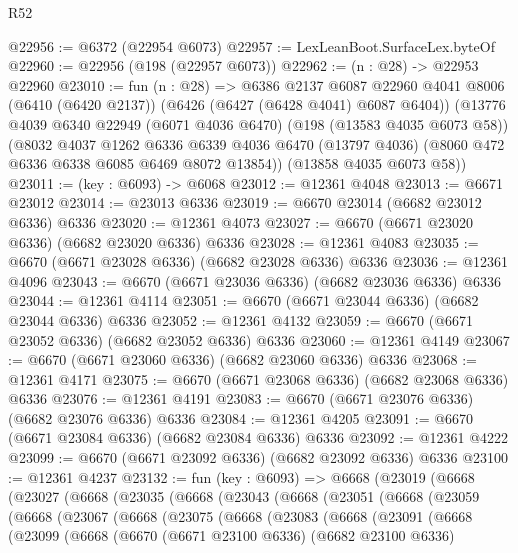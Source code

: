 \begin{lexlean}{R52}
\begin{coremodule}
@22956 := @6372 (@22954 @6073)
@22957 := LexLeanBoot.SurfaceLex.byteOf
@22960 := @22956 (@198 (@22957 @6073))
@22962 := (n : @28) -> @22953 @22960
@23010 := fun (n : @28) =>
  @6386
    @2137
    @6087
    @22960
    @4041
    @8006
    (@6410 (@6420 @2137))
    (@6426 (@6427 (@6428 @4041) @6087 @6404))
    (@13776
      @4039
      @6340
      @22949
      (@6071 @4036 @6470)
      (@198 (@13583 @4035 @6073 @58))
      (@8032
        @4037
        @1262
        @6336
        @6339
        @4036
        @6470
        (@13797 @4036)
        (@8060 @472 @6336 @6338 @6085 @6469 @8072 @13854))
      (@13858 @4035 @6073 @58))
@23011 := (key : @6093) -> @6068
@23012 := @12361 @4048
@23013 := @6671 @23012
@23014 := @23013 @6336
@23019 := @6670 @23014 (@6682 @23012 @6336) @6336
@23020 := @12361 @4073
@23027 := @6670 (@6671 @23020 @6336) (@6682 @23020 @6336) @6336
@23028 := @12361 @4083
@23035 := @6670 (@6671 @23028 @6336) (@6682 @23028 @6336) @6336
@23036 := @12361 @4096
@23043 := @6670 (@6671 @23036 @6336) (@6682 @23036 @6336) @6336
@23044 := @12361 @4114
@23051 := @6670 (@6671 @23044 @6336) (@6682 @23044 @6336) @6336
@23052 := @12361 @4132
@23059 := @6670 (@6671 @23052 @6336) (@6682 @23052 @6336) @6336
@23060 := @12361 @4149
@23067 := @6670 (@6671 @23060 @6336) (@6682 @23060 @6336) @6336
@23068 := @12361 @4171
@23075 := @6670 (@6671 @23068 @6336) (@6682 @23068 @6336) @6336
@23076 := @12361 @4191
@23083 := @6670 (@6671 @23076 @6336) (@6682 @23076 @6336) @6336
@23084 := @12361 @4205
@23091 := @6670 (@6671 @23084 @6336) (@6682 @23084 @6336) @6336
@23092 := @12361 @4222
@23099 := @6670 (@6671 @23092 @6336) (@6682 @23092 @6336) @6336
@23100 := @12361 @4237
@23132 := fun (key : @6093) =>
  @6668
    (@23019
      (@6668
        (@23027
          (@6668
            (@23035
              (@6668
                (@23043
                  (@6668
                    (@23051
                      (@6668
                        (@23059
                          (@6668
                            (@23067
                              (@6668
                                (@23075
                                  (@6668
                                    (@23083
                                      (@6668
                                        (@23091
                                          (@6668
                                            (@23099
                                              (@6668
                                                (@6670
                                                  (@6671 @23100 @6336)
                                                  (@6682 @23100 @6336)

\end{coremodule}
\end{lexlean}
